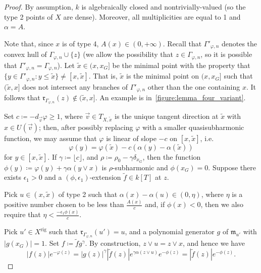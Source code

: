 \documentclass[10pt,reqno]{amsart}
\theoremstyle{plain}
\theoremstyle{definition}
\newcommand{\frakm}{\mathfrak{m}}
\numberwithin{equation}{section}
\DeclareMathOperator{\rig}{rig}
\begin{document}
\begin{proof}
By assumption, $k$ is algebraically closed and nontrivially-valued (so the type 2 points of $X$ are dense). 
Moreover, all multiplicities are equal to 1 and $\alpha = A$. 

Note that, since $x$ is of type 4, $A(x) \in (0,+\infty)$.
Recall that $\Gamma'_{\varphi,n}$ denotes the convex hull of $\Gamma_{\varphi,n} \cup \{ z \}$ (we allow the possibility that $z \in \Gamma_{\varphi,n}$, so it is possible that $\Gamma'_{\varphi,n} = \Gamma_{\varphi,n}$). Let $\tilde{x} \in (x,x_G]$ be the minimal point with the property that $\{ y \in \Gamma'_{\varphi,n} \colon y \leq \tilde{x} \} \not= [x,\tilde{x}]$. That is, $\tilde{x}$ is the minimal point on $(x,x_G]$ such that $(\tilde{x},x]$ does not intersect any branches of $\Gamma'_{\varphi,n}$ other than the one containing $x$. 
It follows that $\mathfrak{r}_{\Gamma_{\varphi,n}}(z) \not\in (\tilde{x},x]$. 
An example is in~\cref{figure:lemma_four_variant}.

Set $c \coloneqq-d_{\vec{v}}\varphi \geq 1$, where $\vec{v} \in T_{X,\tilde{x}}$ is the unique tangent direction at $\tilde{x}$ with $x \in U(\vec{v})$; then, after possibly replacing $\varphi$ with a smaller quasisubharmonic function, we may assume that $\varphi$ is linear of slope $-c$ on $[x,\tilde{x}]$, i.e.\ 
$$
\varphi(y) = \varphi(\tilde{x}) - c\left(\alpha(y) - \alpha(\tilde{x}) \right)
$$
for $y \in [x,\tilde{x}]$.
If $\gamma \coloneqq \lfloor c \rfloor$, and $\rho \coloneqq \rho_0 - \gamma\delta_{x_G}$, then the function $\phi(y) \coloneqq \varphi(y) + \gamma  \alpha(y \vee x)$ is $\rho$-subharmonic and $\phi(x_G) = 0$. 
Suppose there exists $\epsilon_1 > 0$ and a $(\phi,\epsilon_1)$-extension $\tilde{f} \in k[T]$ at $z$. 

Pick $u \in (x,\tilde{x})$ of type 2 such that $\alpha(x) - \alpha(u) \in (0,\eta)$, where $\eta$ is a positive number chosen to be less than $\frac{A(x)}{c }$ and, if $\phi(x) < 0$, then we also require that $\eta < \frac{-\epsilon_1 \phi(x)}{c }$. 
%
%

Pick $u' \in X^{\rig}$ such that $\mathfrak{r}_{\Gamma_{\varphi,n}}(u') = u$, and a polynomial generator $g$ of $\frakm_{u'}$ with $|g(x_G)| = 1$. 
Set $f \coloneqq \tilde{f} g^{\gamma}$. 
By construction, $z \vee u = z \vee x$, and hence we have
$$
|f(z)|e^{-\varphi(z)} = |g(z)|^{\gamma} |\tilde{f}(z)|e^{\gamma\alpha(z \vee u)} e^{-\phi(z)} = |\tilde{f}(z)|e^{-\phi(z)}.
$$


\end{proof}
\end{document}
